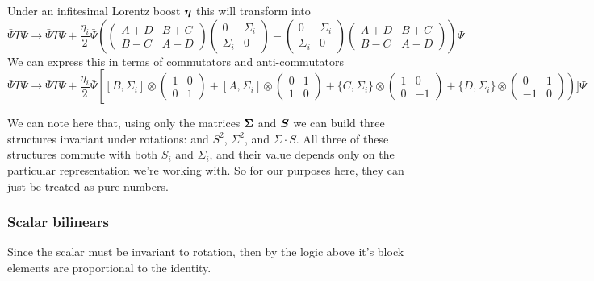 Under an infitesimal Lorentz boost $\mbox{\boldmath$ \eta $}$ this will transform into
\[
	\bar{\Psi} T \Psi \to \bar{\Psi} T \Psi
		+ \frac{\eta_i}{2} \bar{\Psi} \left (  \begin{pmatrix} A + D & B+C \\ B-C & A - D \end{pmatrix} \begin{pmatrix} 0 & \Sigma_i \\ \Sigma_i & 0 \end{pmatrix} - \begin{pmatrix} 0 & \Sigma_i \\ \Sigma_i & 0 \end{pmatrix} \begin{pmatrix} A + D & B+C \\ B-C & A - D \end{pmatrix} \right ) \Psi					
\]
We can express this in terms of commutators and anti-commutators
\[
	\bar{\Psi} T \Psi \to \bar{\Psi} T \Psi
		+ \frac{\eta_i}{2} \bar{\Psi} \left [
			[B, \Sigma_i] \otimes \begin{pmatrix} 1 & 0 \\ 0 & 1 \end{pmatrix}
			+ [A, \Sigma_i] \otimes \begin{pmatrix} 0 & 1 \\ 1 & 0 \end{pmatrix}
 			+ \{C, \Sigma_i\} \otimes \begin{pmatrix} 1 & 0 \\ 0 & -1\end{pmatrix}
			+ \{D, \Sigma_i\} \otimes \begin{pmatrix} 0 & 1 \\ -1 & 0 \end{pmatrix}
	\right)] \Psi
\]

We can note here that, using only the matrices $\mbox{\boldmath$ \Sigma $}$ and $\mbox{\boldmath$ S $}$ we can build three structures invariant under rotations: and $S^2$, $\Sigma^2$, and $\Sigma \cdot S$.  All three of these structures commute with both $S_i$ and $\Sigma_i$, and their value depends only on the particular representation we're working with.  So for our purposes here, they can just be treated as pure numbers.


\subsubsection{Scalar bilinears}
Since the scalar must be invariant to rotation, then by the logic above it's block elements are proportional to the identity.

